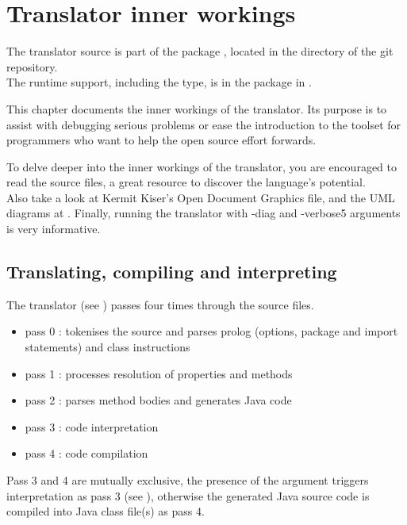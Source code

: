
\chapter{Translator inner workings}

The translator source is part of the package
, located in the  directory of the git repository.\\
The runtime support, including the  type, is in the package  in .

This chapter documents the inner workings of the
translator. Its purpose is to assist with debugging
serious problems or ease the introduction to the toolset for
programmers who want to help the open source effort forwards.

To delve deeper into the inner workings of the translator, you are encouraged to read the \nr{} source files,
a great resource to discover the language's potential.\\ Also take a look at Kermit Kiser's
Open Document Graphics file, and the \nr{} UML diagrams at .
Finally, running the translator with -diag and -verbose5 arguments is very informative.


\section{Translating, compiling and interpreting}
The translator (see ) passes four times through the \nr{} source files.
\begin{itemize}
    \item pass 0 : tokenises the source and parses prolog (options, package and import statements) and
 class instructions
    \item pass 1 : processes resolution of properties and methods
    \item pass 2 : parses method bodies and generates Java code
    \item pass 3 : code interpretation
    \item pass 4 : code compilation
\end{itemize}
Pass 3 and 4 are mutually exclusive, the presence of the  argument triggers interpretation
as pass 3 (see ),
otherwise the generated Java source code is compiled into Java class file(s) as pass 4.


